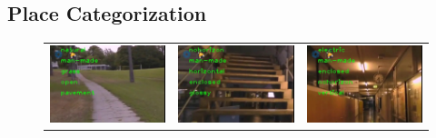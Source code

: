 \documentclass[letterpaper, 10 pt, conference]{ieeeconf}  %
\begin{document}
\subsection{Place Categorization}

\newcommand{\scaleVal}{0.27}
\begin{figure}
	\centering
	\begin{tabular}{ccc}
		\includegraphics[scale=\scaleVal]{1-outdoor} &
		\includegraphics[scale=\scaleVal]{2-stairs} &
		\includegraphics[scale=\scaleVal]{3-indoor} \\

\end{tabular}
\end{figure}
\end{document}
